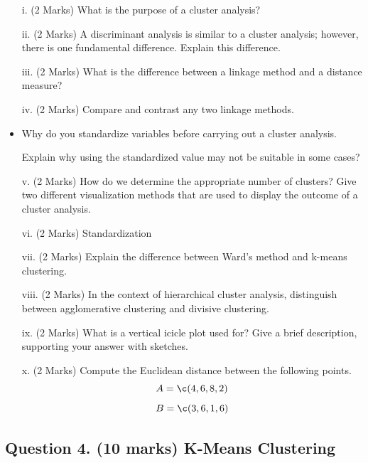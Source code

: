 \documentclass[a4paper,12pt]{article}
\begin{document}
\begin{itemize}
	\item[i.](2 Marks) What is the purpose of a cluster analysis?
	
	\item[ii.](2 Marks)  A discriminant analysis is similar to a cluster analysis; however, there is one fundamental difference.  Explain this difference.
	
	\item[iii.](2 Marks)  What is the difference between a linkage method and a distance measure?
	
	\item[iv.](2 Marks)  Compare and contrast any two linkage methods.
	
	\item 
	
	Why do you standardize variables before carrying out a cluster analysis.
	
	Explain why using the standardized value may not be suitable in some cases?
	
	\item[v.](2 Marks)  How do we determine the appropriate number of clusters?  Give two different visualization methods that are used to display the outcome of a cluster analysis.
	
	\item[vi.](2 Marks) Standardization
	
	\item[vii.](2 Marks)  Explain the difference between Ward's method and k-means
	clustering.

	\item[viii.](2 Marks)  In the context of hierarchical cluster analysis, distinguish between agglomerative clustering and divisive clustering.
	\item[ix.](2 Marks)  What is a vertical icicle plot used for? Give a brief description, supporting your answer with sketches.
	\item[x.](2 Marks)  Compute the Euclidean distance between the following points.
	\[ A = \c(4,6,8,2)\]
	\[ B = \c(3,6,1,6)\]
	
\end{itemize}



\newpage

\subsection*{Question 4. (10 marks) K-Means Clustering}
\end{document}
